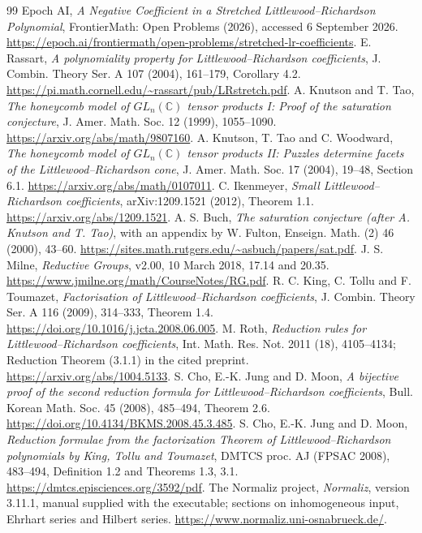 \documentclass[11pt]{article}
\begin{document}
\begin{thebibliography}{99}
 Epoch AI, \emph{A Negative Coefficient in a Stretched
Littlewood--Richardson Polynomial}, FrontierMath: Open Problems (2026),
accessed 6 September 2026.
\url{https://epoch.ai/frontiermath/open-problems/stretched-lr-coefficients}.
 E. Rassart, \emph{A polynomiality property for
Littlewood--Richardson coefficients}, J. Combin. Theory Ser. A 107
(2004), 161--179, Corollary 4.2.
\url{https://pi.math.cornell.edu/~rassart/pub/LRstretch.pdf}.
 A. Knutson and T. Tao, \emph{The honeycomb model of
$GL_n(\mathbb C)$ tensor products I: Proof of the saturation conjecture},
J. Amer. Math. Soc. 12 (1999), 1055--1090.
\url{https://arxiv.org/abs/math/9807160}.
 A. Knutson, T. Tao and C. Woodward, \emph{The honeycomb
model of $GL_n(\mathbb C)$ tensor products II: Puzzles determine facets
of the Littlewood--Richardson cone}, J. Amer. Math. Soc. 17 (2004),
19--48, Section 6.1.
\url{https://arxiv.org/abs/math/0107011}.
 C. Ikenmeyer, \emph{Small Littlewood--Richardson
coefficients}, arXiv:1209.1521 (2012), Theorem 1.1.
\url{https://arxiv.org/abs/1209.1521}.
 A. S. Buch, \emph{The saturation conjecture
(after A. Knutson and T. Tao)}, with an appendix by W. Fulton,
Enseign. Math. (2) 46 (2000), 43--60.
\url{https://sites.math.rutgers.edu/~asbuch/papers/sat.pdf}.
 J. S. Milne, \emph{Reductive Groups}, v2.00,
10 March 2018, 17.14 and 20.35.
\url{https://www.jmilne.org/math/CourseNotes/RG.pdf}.
 R. C. King, C. Tollu and F. Toumazet,
\emph{Factorisation of Littlewood--Richardson coefficients},
J. Combin. Theory Ser. A 116 (2009), 314--333, Theorem 1.4.
\url{https://doi.org/10.1016/j.jcta.2008.06.005}.
 M. Roth, \emph{Reduction rules for Littlewood--Richardson
coefficients}, Int. Math. Res. Not. 2011 (18), 4105--4134;
Reduction Theorem (3.1.1) in the cited preprint.
\url{https://arxiv.org/abs/1004.5133}.
 S. Cho, E.-K. Jung and D. Moon,
\emph{A bijective proof of the second reduction formula for
Littlewood--Richardson coefficients}, Bull. Korean Math. Soc. 45
(2008), 485--494, Theorem 2.6.
\url{https://doi.org/10.4134/BKMS.2008.45.3.485}.
 S. Cho, E.-K. Jung and D. Moon,
\emph{Reduction formulae from the factorization Theorem of
Littlewood--Richardson polynomials by King, Tollu and Toumazet},
DMTCS proc. AJ (FPSAC 2008), 483--494, Definition 1.2 and
Theorems 1.3, 3.1.
\url{https://dmtcs.episciences.org/3592/pdf}.
 The Normaliz project,
\emph{Normaliz}, version 3.11.1, manual supplied with the executable;
sections on inhomogeneous input, Ehrhart series and Hilbert series.
\url{https://www.normaliz.uni-osnabrueck.de/}.
\end{thebibliography}
\end{document}
